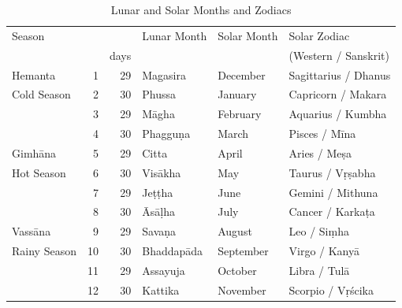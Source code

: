 \documentclass[11pt,oneside]{memoir-article}
\begin{document}
\begin{table}[h]
\caption{\label{tbl-month-names} Lunar and Solar Months and Zodiacs\autocite{hasapannyo-zodiac}}
\centering
\begin{tabular}{lrrlll}
Season &  &  & Lunar Month & Solar Month & Solar Zodiac\\
 &  & days &  &  & (Western / Sanskrit)\\
\hline
Hemanta & 1 & 29 & Magasira & December & Sagittarius / Dhanus\\
Cold Season & 2 & 30 & Phussa & January & Capricorn / Makara\\
 & 3 & 29 & Māgha & February & Aquarius / Kumbha\\
 & 4 & 30 & Phagguṇa & March & Pisces / Mīna\\
\hline
Gimhāna & 5 & 29 & Citta & April & Aries / Meṣa\\
Hot Season & 6 & 30 & Visākha & May & Taurus / Vṛṣabha\\
 & 7 & 29 & Jeṭṭha & June & Gemini / Mithuna\\
 & 8 & 30 & Āsāḷha & July & Cancer / Karkaṭa\\
\hline
Vassāna & 9 & 29 & Savaṇa & August & Leo / Siṃha\\
Rainy Season & 10 & 30 & Bhaddapāda & September & Virgo / Kanyā\\
 & 11 & 29 & Assayuja & October & Libra / Tulā\\
 & 12 & 30 & Kattika & November & Scorpio / Vṛścika\\
\end{tabular}
\end{table}

\spewnotes


\savenotes
\end{document}
